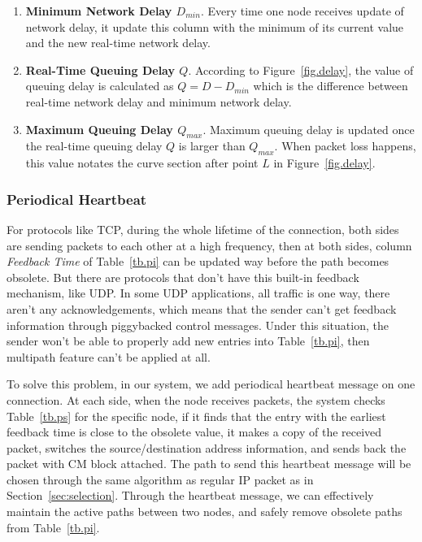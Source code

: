 \begin{enumerate}
\item \textbf{Minimum Network Delay $D_{min}$}. Every time one node receives update of network delay, it update this column with the minimum of its current value and the new real-time network delay.
\item \textbf{Real-Time Queuing Delay $Q$}. According to Figure~\ref{fig.delay}, the value of queuing delay is calculated as $Q=D-D_{min}$ which is the difference between real-time network delay and minimum network delay.
\item \textbf{Maximum Queuing Delay $Q_{max}$}. Maximum queuing delay is updated once the real-time queuing delay $Q$ is larger than $Q_{max}$. When packet loss happens, this value notates the curve section after point $L$ in Figure~\ref{fig.delay}.
\end{enumerate}


\subsubsection{Periodical Heartbeat}

For protocols like TCP, during the whole lifetime of the connection, both sides are sending packets to each other at a high frequency, then at both sides, column \emph{Feedback Time} of Table~\ref{tb.pi} can be updated way before the path becomes obsolete. But there are protocols that don\textquoteright t have this built-in feedback mechanism, like UDP. In some UDP applications, all traffic is one way, there aren\textquoteright t any acknowledgements, which means that the sender can\textquoteright t get feedback information through piggybacked control messages. Under this situation, the sender won\textquoteright t be able to properly add new entries into Table~\ref{tb.pi}, then multipath feature can\textquoteright t be applied at all. 

To solve this problem, in our system, we add periodical heartbeat message on one connection. At each side, when the node receives packets, the system checks Table~\ref{tb.ps} for the specific node, if it finds that the entry with the earliest feedback time is close to the obsolete value, it makes a copy of the received packet, switches the source/destination address information, and sends back the packet with CM block attached. The path to send this heartbeat message will be chosen through the same algorithm as regular IP packet as in Section~\ref{sec:selection}. Through the heartbeat message, we can effectively maintain the active paths between two nodes, and safely remove obsolete paths from Table~\ref{tb.pi}. 

